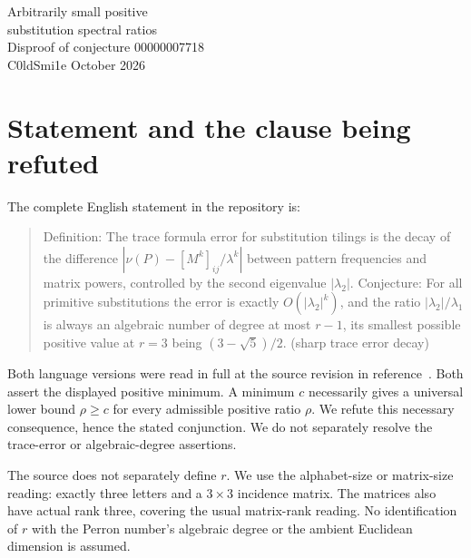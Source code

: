 \documentclass[11pt,a4paper]{article}
\begin{document}
\begin{center}
{\LARGE Arbitrarily small positive\\[3pt] substitution spectral ratios}\\[7pt]
{\large Disproof of conjecture 00000007718}\\[5pt]
C0ldSmi1e  October 2026
\end{center}
\begin{abstract}
A family of primitive three-letter substitutions has full-rank incidence matrices with complete spectrum $3m+3,3,1$, for every integer $m\ge1$. Its positive ratio $|\lambda_2|/\lambda_1=1/(m+1)$ can be arbitrarily small. At $m=2$ it equals $1/3<(3-\sqrt5)/2$, contradicting the conjectured minimum. The substitutions are actual words and admit genuine geometric realizations by three colored unit intervals. The Lean development proves the word counts, geometric patch conditions, complete complex spectra, eigenvalue ordering, and the lower-bound refutation.
\end{abstract}

\section{Statement and the clause being refuted}
The complete English statement in the repository is:
\begin{quote}\small
Definition: The trace formula error for substitution tilings is the decay of the difference $|\nu(P)-[M^k]_{ij}/\lambda^k|$ between pattern frequencies and matrix powers, controlled by the second eigenvalue $|\lambda_2|$. Conjecture: For all primitive substitutions the error is exactly $O(|\lambda_2|^k)$, and the ratio $|\lambda_2|/\lambda_1$ is always an algebraic number of degree at most $r-1$, its smallest possible positive value at $r=3$ being $(3-\sqrt5)/2$. (sharp trace error decay)
\end{quote}
Both language versions were read in full at the source revision in reference~\cite{source}. Both assert the displayed positive minimum. A minimum $c$ necessarily gives a universal lower bound $\rho\ge c$ for every admissible positive ratio $\rho$. We refute this necessary consequence, hence the stated conjunction. We do not separately resolve the trace-error or algebraic-degree assertions.

The source does not separately define $r$. We use the alphabet-size or matrix-size reading: exactly three letters and a $3\times3$ incidence matrix. The matrices also have actual rank three, covering the usual matrix-rank reading. No identification of $r$ with the Perron number's algebraic degree or the ambient Euclidean dimension is assumed.
\end{document}

